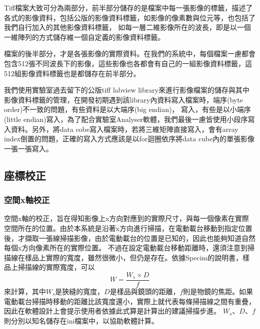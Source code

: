 \documentclass[12pt]{article}
\begin{document}
    Tiff檔案大致可分為兩部分，前半部分儲存的是檔案中每一張影像的標籤，描述了各式的影像資料，包括公版的影像資料標籤，如影像的像素數與位元等，也包括了我們自行加入的其他影像資料標籤，
    如每一層二維影像所在的波長，即是以一個一維陣列的方式儲存維一個自定義的影像資料標籤。

    檔案的後半部分，才是各張影像的實際資料。在我們的系統中，每個檔案一慮都會包含512張不同波長下的影像，這些影像也各都會有自己的一組影像資料標籤，這512組影像資料標籤也是都儲存在前半部分。

    我們使用實驗室過去留下的公版tiff labview library來進行影像檔案的儲存與其中影像資料標籤的管理，在開發初期遇到該library內資料寫入檔案時，端序(byte order)不一致的問題，有些資料是以大端序(big endian)，
    寫入，有些是以小端序(little endian)寫入，為了配合實驗室Analyser軟體，我們最後一慮皆使用小段序寫入資料。另外，將data cobe寫入檔案時，若將三維矩陣直接寫入，會有array index倒置的問題，正確的寫入方式應該是以for迴圈依序將data cube內的單張影像一張一張寫入。

    \subsection{座標校正}
    \subsubsection{空間x軸校正}
    空間x軸的校正，旨在得知影像上x方向對應到的實際尺寸，與每一個像素在實際空間所在的位置。由於本系統是沿著x方向進行掃描，在電動載台移動到指定位置後，才擷取一張線掃描影像，由於電動載台的位置是已知的，因此也能夠知道自然每個x方向像素所在的實際位置。
    不過在設定電動載台移動距離時，還須注意到掃描線在樣品上實際的寬度，雖然很微小，但仍是存在。依據Specim的說明書，樣品上掃描線的實際寬度，可以
    \begin{equation*}
        W=\frac{W_s\times D}{f}
    \end{equation*}
    來計算，其中$W_s$是狹縫的寬度，$D$是樣品與鏡頭的距離，$f$則是物鏡的焦距。如果電動載台掃描時移動的距離比該寬度還小，實際上就代表每條掃描線之間有重疊，因此在軟體設計上會提示使用者依據此式算是計算出的建議掃描步進。
    $W_s$、$D$、$f$則分別以知名儲存在ini檔案中，以協助軟體計算。
\end{document}
